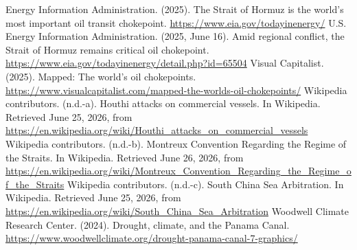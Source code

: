 \begin{referencelist}
   Energy Information Administration. (2025). The Strait of Hormuz is the world's most important oil transit chokepoint. \url{https://www.eia.gov/todayinenergy/}
   U.S. Energy Information Administration. (2025, June 16). Amid regional conflict, the Strait of Hormuz remains critical oil chokepoint. \url{https://www.eia.gov/todayinenergy/detail.php?id=65504}
   Visual Capitalist. (2025). Mapped: The world's oil chokepoints. \url{https://www.visualcapitalist.com/mapped-the-worlds-oil-chokepoints/}
   Wikipedia contributors. (n.d.-a). Houthi attacks on commercial vessels. In Wikipedia. Retrieved June 25, 2026, from \url{https://en.wikipedia.org/wiki/Houthi_attacks_on_commercial_vessels}
   Wikipedia contributors. (n.d.-b). Montreux Convention Regarding the Regime of the Straits. In Wikipedia. Retrieved June 26, 2026, from \url{https://en.wikipedia.org/wiki/Montreux_Convention_Regarding_the_Regime_of_the_Straits}
   Wikipedia contributors. (n.d.-c). South China Sea Arbitration. In Wikipedia. Retrieved June 25, 2026, from \url{https://en.wikipedia.org/wiki/South_China_Sea_Arbitration}
   Woodwell Climate Research Center. (2024). Drought, climate, and the Panama Canal. \url{https://www.woodwellclimate.org/drought-panama-canal-7-graphics/}
\end{referencelist}
